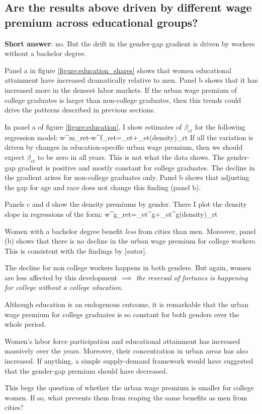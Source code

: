 
\subsection{Are the results above driven by different wage premium across educational groups?}

\noindent\textbf{Short answer}: no. But the drift in the gender-gap gradient is driven by workers without a bachelor degree.

Panel a in figure \ref{figure:education_shares} shows that women educational attainment have increased dramatically relative to men. Panel b shows that it has increased more in the densest labor markets. If the urban wage premium of college graduates is larger than non-college graduates, then this trends could drive the patterns described in previous sections.





In panel a of figure \ref{figure:education}, I show estimates of $\beta_{et}$ for the following regression model:
\beqns
w^m_{ret}-w^f_{ret}=\alpha_{et}+\beta_{et}\ln(density)_{rt}
\eeqns
If all the variation is driven by changes in education-specific urban wage premium, then we should expect $\beta_{et}$ to be zero in all years. This is not what the data shows. The gender-gap gradient is positive and mostly constant for college graduates. The decline in the gradient arises for non-college graduates only. Panel b shows that adjusting the gap for age and race does not change this finding (panel b).


Panels c and d show the density premiums by gender. There I plot the density slope in regressions of the form:
\beqns 
	w^g_{ret}=\alpha_{et}^g+\beta_{et}^g\ln(density)_{rt}
\eeqns

\bitem
	\item Women with a bachelor degree benefit \textit{less} from cities than men. Moreover, panel (b) shows that there is no decline in the urban wage premium for college workers. This is consistent with the findings by [autor].
	\item The decline for non college workers happens in both genders. But again, women are less affected by this development $\implies$ \textit{the reversal of fortunes is happening for college without a college education.}
\eitem 

Although education is an endogenous outcome, it is remarkable that the urban wage premium for college graduates is so constant for both genders over the whole period. 
\bitem
	\item Women's labor force participation and educational attainment has increased massively over the years. Moreover, their concentration in urban areas has also increased. If anything, a simple supply-demand framework would have suggested that the gender-gap premium should have decreased.
	\item This begs the question of whether the urban wage premium is smaller for college women. If so, what prevents them from reaping the same benefits as men from cities?
\eitem 

